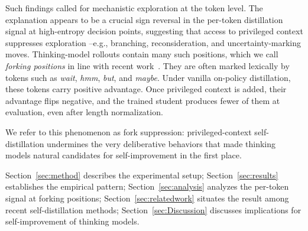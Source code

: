 Such findings called for mechanistic exploration at the token level. The explanation appears to be a crucial sign reversal in the per-token distillation signal at high-entropy decision points, suggesting that access to privileged context suppresses exploration --e.g.,  branching, reconsideration, and uncertainty-marking moves. Thinking-model rollouts contain many such positions, which we call {\em forking positions} in line with recent work~\citep{bigelow2024forking,lin2024critical,vassoyan2025ignore,zhang2026embarrassingly}. They are often marked lexically by tokens such as \emph{wait}, \emph{hmm}, \emph{but}, and \emph{maybe}. Under vanilla on-policy distillation, these tokens carry positive advantage. Once privileged context is added, their advantage flips negative, and the trained student produces fewer of them at evaluation, even after length normalization.

We refer to this phenomenon as fork suppression: privileged-context self-distillation undermines the very deliberative behaviors that made thinking models natural candidates for self-improvement in the first place.

Section~\ref{sec:method} describes the experimental setup; Section~\ref{sec:results} establishes the empirical pattern; Section~\ref{sec:analysis} analyzes the per-token signal at forking positions; Section~\ref{sec:relatedwork} situates the result among recent self-distillation methods; Section~\ref{sec:Discussion} discusses implications for self-improvement of thinking models.

